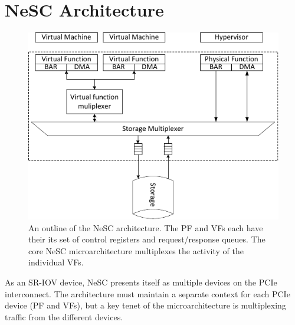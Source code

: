 \chapter{NeSC Architecture}
\label{chap:architecture}


\begin{figure}[ht]
  \centering
  \includegraphics[width=1\columnwidth]{figs/architecture.pdf}
  \caption{An outline of the NeSC architecture. The PF and VFs each have their its set of control registers and request/response queues. The core NeSC microarchitecture multiplexes the activity of the individual VFs.}
  \label{fig:architecture}
\end{figure}



%



As an SR-IOV device, NeSC presents itself as multiple devices on the PCIe interconnect. The architecture must maintain a separate context for each PCIe device (PF and VFs), but a key tenet of the microarchitecture is multiplexing traffic from the different devices.

